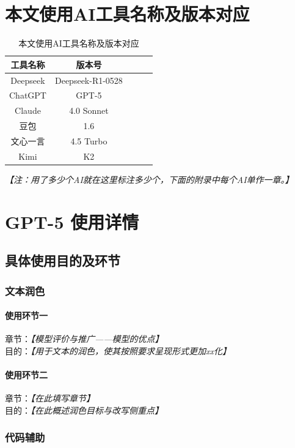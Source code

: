 \documentclass[12pt]{ctexart}
\newcommand{\ph}[1]{\textit{【#1】}}
\begin{document}
\section{本文使用AI工具名称及版本对应}

\begin{table}[!htbp]
    \caption{本文使用AI工具名称及版本对应}\label{tab:001} \centering
    \begin{tabular}{ccccc}
        \toprule[1.5pt]
    \textbf{工具名称} & \textbf{版本号} \\
    \midrule[1pt]
    Deepseek & Deepseek-R1-0528 \\
    ChatGPT & GPT-5 \\
    Claude & 4.0 Sonnet \\
    豆包 & 1.6 \\
    文心一言 & 4.5 Turbo \\
    Kimi & K2 \\
    \bottomrule[0.5pt]
    \end{tabular}
\end{table}
\ph{注：用了多少个AI就在这里标注多少个，下面的附录中每个AI单作一章。}

\newpage

\section{GPT-5 使用详情}
\subsection{具体使用目的及环节}

\subsubsection{文本润色}
\paragraph{使用环节一}
章节：\ph{模型评价与推广——模型的优点} \\
目的：\ph{用于文本的润色，使其按照要求呈现形式更加xx化}

\paragraph{使用环节二}
章节：\ph{在此填写章节} \\
目的：\ph{在此概述润色目标与改写侧重点}

\subsubsection{代码辅助}
\end{document}
